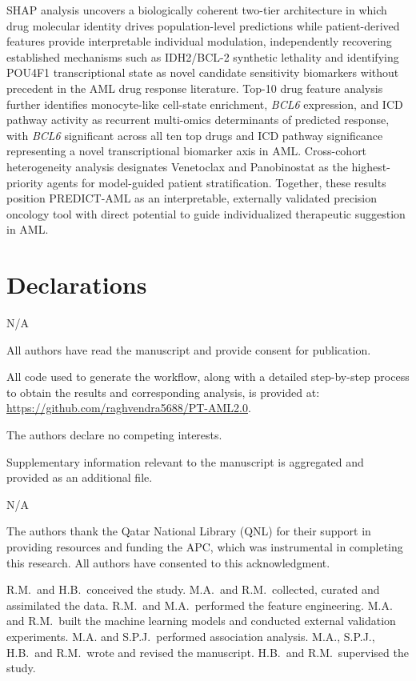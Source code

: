 \documentclass[pdflatex,sn-mathphys-num]{sn-jnl}
\theoremstyle{thmstyleone}
\theoremstyle{thmstyletwo}
\theoremstyle{thmstylethree}
\begin{document}
SHAP analysis uncovers a biologically coherent two-tier architecture in which drug molecular identity drives population-level predictions while patient-derived features provide interpretable individual modulation, independently recovering established mechanisms such as IDH2/BCL-2 synthetic lethality and identifying POU4F1 transcriptional state as novel candidate sensitivity biomarkers without precedent in the AML drug response literature. Top-10 drug feature analysis further identifies monocyte-like cell-state enrichment, \textit{BCL6} expression, and ICD pathway activity as recurrent multi-omics determinants of predicted response, with \textit{BCL6} significant across all ten top drugs and ICD pathway significance representing a novel transcriptional biomarker axis in AML. Cross-cohort heterogeneity analysis designates Venetoclax and Panobinostat as the highest-priority agents for model-guided patient stratification. Together, these results position PREDICT-AML as an interpretable, externally validated precision oncology tool with direct potential to guide individualized therapeutic suggestion in AML.

\section*{Declarations}

N/A

All authors have read the manuscript and provide consent for publication.

All code used to generate the workflow, along with a detailed step-by-step process to obtain the results and corresponding analysis, is provided at: \url{https://github.com/raghvendra5688/PT-AML2.0}.

The authors declare no competing interests.

Supplementary information relevant to the manuscript is aggregated and provided as an additional file.

N/A

The authors thank the Qatar National Library (QNL) for their support in providing resources and funding the APC, which was instrumental in completing this research. All authors have consented to this acknowledgment.

R.M.\ and H.B.\ conceived the study. M.A.\ and R.M.\ collected, curated and assimilated the data. R.M.\ and M.A.\ performed the feature engineering. M.A. and R.M.\ built the machine learning models and conducted external validation experiments. M.A. and S.P.J.\ performed association analysis. M.A., S.P.J., H.B.\ and R.M.\ wrote and revised the manuscript. H.B.\ and R.M.\ supervised the study.


\end{document}
